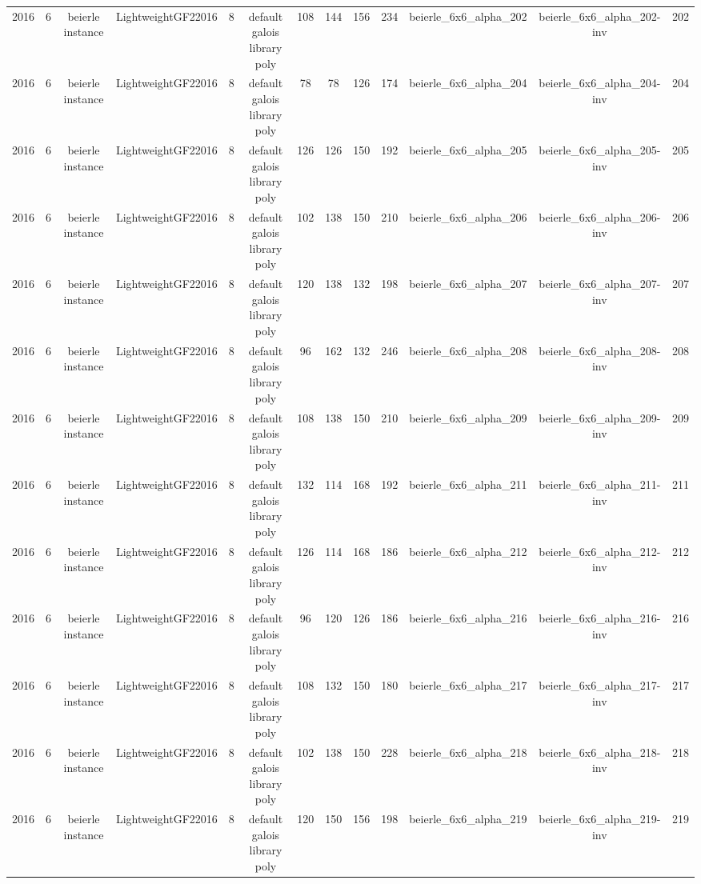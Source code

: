 \begin{tabular}{c c c c c c c c c c c c c}
2016 & 6 & beierle instance & LightweightGF22016 & 8 & default galois library poly & 108 & 144 & 156 & 234 & beierle_6x6_alpha_202 & beierle_6x6_alpha_202-inv & 202 \\
2016 & 6 & beierle instance & LightweightGF22016 & 8 & default galois library poly & 78 & 78 & 126 & 174 & beierle_6x6_alpha_204 & beierle_6x6_alpha_204-inv & 204 \\
2016 & 6 & beierle instance & LightweightGF22016 & 8 & default galois library poly & 126 & 126 & 150 & 192 & beierle_6x6_alpha_205 & beierle_6x6_alpha_205-inv & 205 \\
2016 & 6 & beierle instance & LightweightGF22016 & 8 & default galois library poly & 102 & 138 & 150 & 210 & beierle_6x6_alpha_206 & beierle_6x6_alpha_206-inv & 206 \\
2016 & 6 & beierle instance & LightweightGF22016 & 8 & default galois library poly & 120 & 138 & 132 & 198 & beierle_6x6_alpha_207 & beierle_6x6_alpha_207-inv & 207 \\
2016 & 6 & beierle instance & LightweightGF22016 & 8 & default galois library poly & 96 & 162 & 132 & 246 & beierle_6x6_alpha_208 & beierle_6x6_alpha_208-inv & 208 \\
2016 & 6 & beierle instance & LightweightGF22016 & 8 & default galois library poly & 108 & 138 & 150 & 210 & beierle_6x6_alpha_209 & beierle_6x6_alpha_209-inv & 209 \\
2016 & 6 & beierle instance & LightweightGF22016 & 8 & default galois library poly & 132 & 114 & 168 & 192 & beierle_6x6_alpha_211 & beierle_6x6_alpha_211-inv & 211 \\
2016 & 6 & beierle instance & LightweightGF22016 & 8 & default galois library poly & 126 & 114 & 168 & 186 & beierle_6x6_alpha_212 & beierle_6x6_alpha_212-inv & 212 \\
2016 & 6 & beierle instance & LightweightGF22016 & 8 & default galois library poly & 96 & 120 & 126 & 186 & beierle_6x6_alpha_216 & beierle_6x6_alpha_216-inv & 216 \\
2016 & 6 & beierle instance & LightweightGF22016 & 8 & default galois library poly & 108 & 132 & 150 & 180 & beierle_6x6_alpha_217 & beierle_6x6_alpha_217-inv & 217 \\
2016 & 6 & beierle instance & LightweightGF22016 & 8 & default galois library poly & 102 & 138 & 150 & 228 & beierle_6x6_alpha_218 & beierle_6x6_alpha_218-inv & 218 \\
2016 & 6 & beierle instance & LightweightGF22016 & 8 & default galois library poly & 120 & 150 & 156 & 198 & beierle_6x6_alpha_219 & beierle_6x6_alpha_219-inv & 219 \\

\end{tabular}

